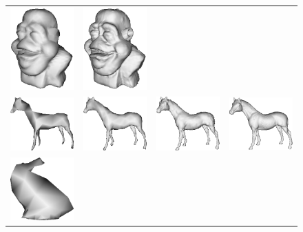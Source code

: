 \begin{figure}
\begin{center}
\begin{tabular}{cccc}
\includegraphics[width=3cm]{../images/dinohead_level3} &
\includegraphics[width=3cm]{../images/dinohead_level5} \\
\includegraphics[width=3cm]{../images/horse_level0} &
\includegraphics[width=3cm]{../images/horse_level1} &
\includegraphics[width=3cm]{../images/horse_level3} &
\includegraphics[width=3cm]{../images/horse_level5} \\
\includegraphics[width=3cm]{../images/bunny_level0} &

\end{tabular}
\end{center}
\end{figure}
